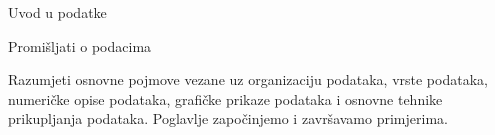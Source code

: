 \begin{chapterpage}{Uvod u podatke}
	\label{introductionToData}
	\label{ch_intro_to_data}
	\noindent
\end{chapterpage}


\renewcommand{\chapterfolder}{ch_intro_to_data}

\begin{tipBox}{%
	\begin{tipBoxTitle}[Cilj: ]{%
			Promišljati o podacima}
	\end{tipBoxTitle}%
Razumjeti osnovne pojmove vezane uz organizaciju podataka, vrste podataka, numeričke opise podataka, grafičke prikaze podataka i osnovne tehnike prikupljanja podataka. Poglavlje započinjemo i završavamo primjerima.}

\end{tipBox}


